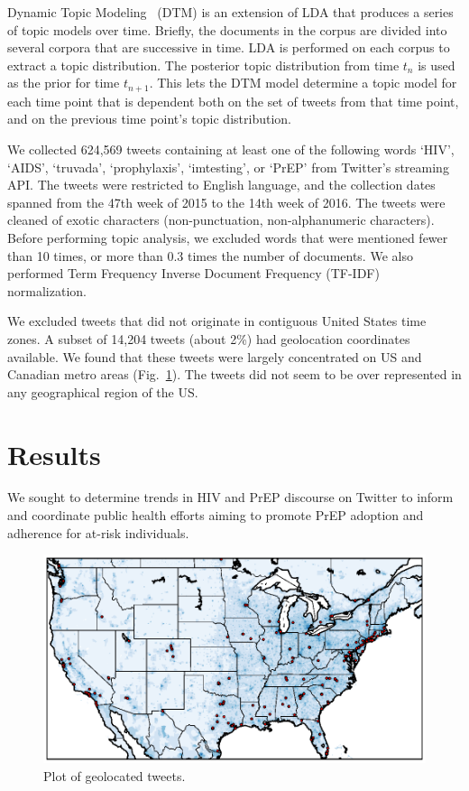 \documentclass[conference]{IEEEtran}
\begin{document}
Dynamic Topic Modeling~\cite{blei2006dynamic} (DTM) is an extension of LDA that produces a series of topic models over time. Briefly, the documents in the corpus are divided into several corpora that are successive in time. LDA is performed on each corpus to extract a topic distribution. The posterior topic distribution from time $t_n$ is used as the prior for time $t_{n+1}$. This lets the DTM model determine a topic model for each time point that is dependent both on the set of tweets from that time point, and on the previous time point's topic distribution.

We collected 624,569 tweets containing at least one of the following words `HIV', `AIDS', `truvada', `prophylaxis', `imtesting', or `PrEP' from Twitter's streaming API. The tweets were restricted to English language, and the collection dates spanned from the 47th week of 2015 to the 14th week of 2016. The tweets were cleaned of exotic characters (non-punctuation, non-alphanumeric characters). Before performing topic analysis, we excluded words that were mentioned fewer than 10 times, or more than 0.3 times the number of documents. We also performed Term Frequency Inverse Document Frequency (TF-IDF) normalization.

We excluded tweets that did not originate in contiguous United States time zones. A subset of 14,204 tweets (about 2\%) had geolocation coordinates available. We found that these tweets were largely concentrated on US and Canadian metro areas (Fig.~\ref{fig:map}). The tweets did not seem to be over represented in any geographical region of the US.

\section{Results}

We sought to determine trends in HIV and PrEP discourse on Twitter to inform and coordinate public health efforts aiming to promote PrEP adoption and adherence for at-risk individuals. 

\begin{figure}
\centering
\includegraphics[scale=0.35]{figs/Fig1}
\caption{Plot of geolocated tweets.}
\label{fig:map}
\end{figure}
\end{document}
